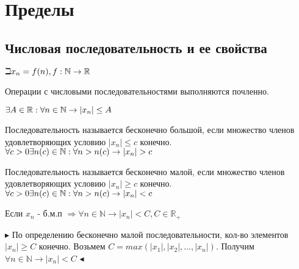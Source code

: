\documentclass[14pt]{extreport}
\begin{document}
\chapter{Пределы}
        \section{Числовая последовательность и ее свойства}
            \begin{definition}
                
                $\\\beth x_n = f(n), f:\mathbb{N} \rightarrow \mathbb{R}$
            \end{definition}

            Операции с числовыми последовательностями выполняются почленно. 
        
                \begin{definition}
                    $\\ \exists A \in \mathbb{R} : \forall n \in \mathbb{N} \rightarrow |x_n| \leq A$
                \end{definition}


                \begin{definition}
                    Последовательность называется бесконечно большой, если множество членов удовлетворяющих условию $|x_n| \leq c$ конечно.
                    $\\ \forall c > 0 \exists n(c) \in \mathbb{N} : \forall n > n(c) \rightarrow |x_n| > c$
                \end{definition}
                
                \begin{definition}
                    Последовательность называется бесконечно малой, если множество членов удовлетворяющих условию $|x_n| \geq c$ конечно.
                    $\\ \forall c > 0 \exists n(c) \in \mathbb{N} : \forall n > n(c) \rightarrow |x_n| < c$
                \end{definition}

                \begin{theorem}
                    Если ${x_n}$ - б.м.п $\Rightarrow \forall n \in \mathbb{N} \rightarrow |x_n| < C, C \in \mathbb{R}_+$
                \end{theorem}
                $\blacktriangleright$
                    По определению бесконечно малой последовательности, кол-во элементов $|x_n| \geq C$ конечно. Возьмем $C = max(|x_1|, |x_2|, ... , |x_n|)$. Получим $\forall n \in \mathbb{N} \rightarrow |x_n| < C$
                $\blacktriangleleft$
                
\end{document}
